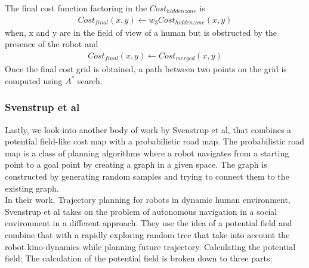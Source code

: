 The final cost function factoring in the $Cost_{hidden zone}$ is
\begin{align}
Cost_{final}(x,y) \leftarrow w_{3} Cost_{hidden zone}(x,y)
\end{align}
when, x and y are in the field of view of a human but is obstructed by the presence of the robot and 
\begin{align}
Cost_{final}(x,y) \leftarrow Cost_{merged}(x,y)
\end{align}
Once the final cost grid is obtained, a path between two points on the grid is computed using $A^*$ search.

\subsubsection*{Svenstrup et al}
Lastly, we look into another body of work by Svenstrup et al, that combines a potential field-like cost map with a probabilistic road map. The probabilistic road map is a class of planning algorithms where a robot navigates from a starting point to a goal point by creating a graph in a given space. The graph is constructed by generating random samples and trying to connect them to the existing graph.\\
In their work, Trajectory planning for robots in dynamic human environment, Svenstrup et al takes on the problem of autonomous navigation in a social environment in a different approach. They use the idea of a potential field and combine that with a rapidly exploring random tree that take into account the robot kino-dynamics while planning future trajectory.
Calculating the potential field:
The calculation of the potential field is broken down to three parts:
